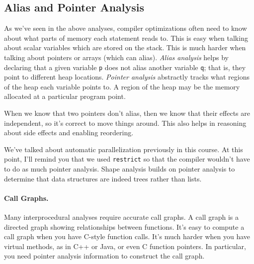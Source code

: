 \documentclass[a4paper]{report}
\begin{document}
\subsection*{Alias and Pointer Analysis}
As we've seen in the above analyses, compiler optimizations often need
to know about what parts of memory each statement reads to.  This is
easy when talking about scalar variables which are stored on the
stack. This is much harder when talking about pointers or arrays
(which can alias). \emph{Alias analysis} helps by declaring that a
given variable {\tt p} does not alias another variable {\tt q}; that
is, they point to different heap locations. \emph{Pointer analysis}
abstractly tracks what regions of the heap each variable points to.
A region of the heap may be the memory allocated at a particular
program point.

When we know that two pointers don't alias, then we know that their
effects are independent, so it's correct to move things around.
This also helps in reasoning about side effects and enabling reordering.

We've talked about automatic parallelization previously in this course.
At this point, I'll remind you that we used {\tt restrict} so that the
compiler wouldn't have to do as much pointer analysis. Shape analysis
builds on pointer analysis to determine that data structures are indeed
trees rather than lists.

\paragraph{Call Graphs.} Many interprocedural analyses require accurate
call graphs. A call graph is a directed graph showing relationships between
functions. It's easy to compute a call graph when you have C-style
function calls. It's much harder when you have virtual methods, as in
C++ or Java, or even C function pointers. In particular, you need pointer
analysis information to construct the call graph.
\end{document}
